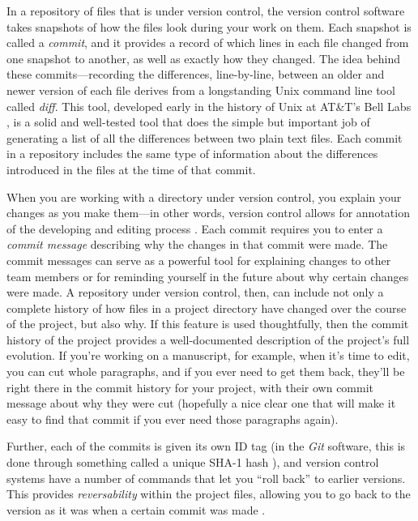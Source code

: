 \documentclass[]{tufte-book}
\begin{document}
In a repository of files that is under version control, the version control
software takes snapshots of how the files look during your work on them. Each
snapshot is called a \emph{commit}, and it provides a record of which lines in each
file changed from one snapshot to another, as well as exactly how they changed.
The idea behind these commits---recording the differences, line-by-line, between
an older and newer version of each file derives from a longstanding Unix command
line tool called \emph{diff}. This tool, developed early in the history of Unix at
AT\&T's Bell Labs \citep{raymond2003art}, is a solid and well-tested tool that does
the simple but important job of generating a list of all the differences between
two plain text files. Each commit in a repository includes the same type of
information about the differences introduced in the files at the time of that
commit.

When you are working with a directory under version control, you explain your
changes as you make them---in other words, version control allows for annotation
of the developing and editing process \citep{raymondunderstanding}. Each commit
requires you to enter a \emph{commit message} describing why the changes in that
commit were made. The commit messages can serve as a powerful tool for
explaining changes to other team members or for reminding yourself in the future
about why certain changes were made. A repository under version control, then,
can include not only a complete history of how files in a project directory have
changed over the course of the project, but also why. If this feature is used
thoughtfully, then the commit history of the project provides a well-documented
description of the project's full evolution. If you're working on a manuscript,
for example, when it's time to edit, you can cut whole paragraphs, and if you
ever need to get them back, they'll be right there in the commit history for
your project, with their own commit message about why they were cut (hopefully a
nice clear one that will make it easy to find that commit if you ever need those
paragraphs again).

Further, each of the commits is given its own ID tag (in the \emph{Git} software,
this is done through something called a unique SHA-1 hash \citep{klemens201421st}),
and version control systems have a number of commands that let you ``roll back''
to earlier versions. This provides \emph{reversability} within the project files,
allowing you to go back to the version as it was when a certain commit was made
\citep{raymondunderstanding}.
\end{document}
